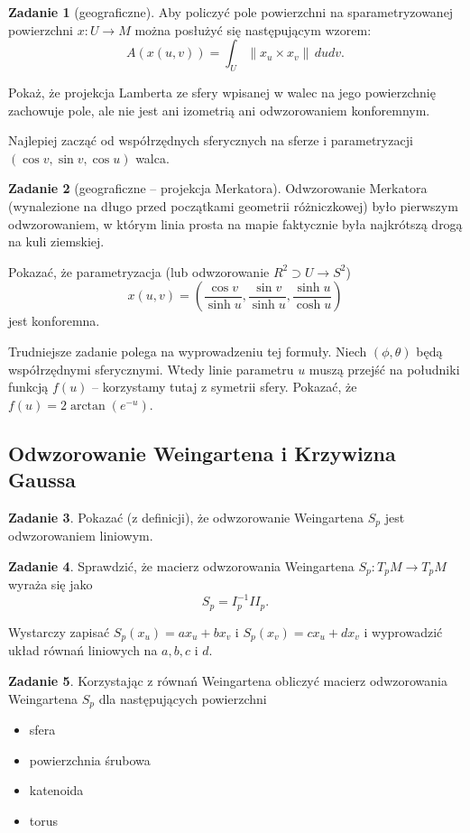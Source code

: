 \documentclass[a4paper,11pt]{article}
\theoremstyle{definition}\newtheorem{exercise}{Zadanie}
\theoremstyle{definition}\newtheorem{remark}{Uwaga}
\begin{document}
\begin{exercise}[geograficzne]
Aby policzyć pole powierzchni na sparametryzowanej powierzchni $x\colon U\to M$ 
można posłużyć się następującym wzorem:
\[A\left(x(u,v)\right)=\int_U \|x_u \times x_v \|\, dudv.\]

Pokaż, że projekcja Lamberta ze sfery wpisanej w walec na jego 
powierzchnię zachowuje pole, ale nie jest ani izometrią ani  
odwzorowaniem konforemnym.

\small{Najlepiej zacząć od wsp\'ołrzędnych sferycznych na sferze i 
parametryzacji $(\cos v,\sin v, \cos u)$ walca.}
\end{exercise}

\begin{exercise}[geograficzne -- projekcja Merkatora]
 Odwzorowanie Merkatora (wynalezione na długo przed początkami geometrii 
r\'ożniczkowej) było pierwszym odwzorowaniem, w kt\'orym linia prosta na mapie 
faktycznie była najkr\'otszą drogą na kuli ziemskiej.

Pokazać, że parametryzacja (lub odwzorowanie $R^2 \supset U \to S^2$)
\[x(u,v)=\left( \frac{\cos v}{\sinh u}, \frac{\sin v}{\sinh u}, 
\frac{\sinh u}{\cosh u}\right)\]
jest konforemna.

\small{Trudniejsze zadanie polega na wyprowadzeniu tej formuły. Niech 
$(\phi,\theta)$ będą wsp\'ołrzędnymi sferycznymi. Wtedy linie parametru $u$ 
muszą przejść na południki funkcją $f(u)$ -- korzystamy tutaj z symetrii sfery. 
Pokazać, że $f(u)=2\arctan(e^{-u})$.}

\end{exercise}


\subsection{Odwzorowanie Weingartena i Krzywizna Gaussa}
\begin{exercise}
Pokazać (z definicji), że odwzorowanie Weingartena $S_p$ jest odwzorowaniem 
liniowym.
\end{exercise}

\begin{exercise}
 Sprawdzić, że macierz odwzorowania Weingartena $S_p \colon T_p 
M \to T_p M$ wyraża się jako
\[S_p = I_p^{-1} II_p. \]
 
 \small{Wystarczy zapisać $S_p(x_u)=ax_u + bx_v$ i $S_p(x_v)=cx_u + d x_v$ i 
wyprowadzić układ r\'ownań liniowych na $a,b,c$ i $d$.}
\end{exercise}

\begin{exercise}
Korzystając z r\'ownań Weingartena obliczyć macierz odwzorowania Weingartena
$S_p$ dla następujących powierzchni
\begin{itemize}
 \item sfera
 \item powierzchnia śrubowa
 \item katenoida
 \item torus
\end{itemize}

\end{exercise}
\end{document}
